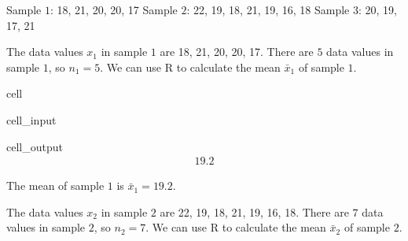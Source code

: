 \documentclass[letterpaper,10pt,english]{jupyterBook}
\begin{document}
\sphinxAtStartPar
Sample \(1\):  18, 21, 20, 20, 17 
Sample \(2\):  22, 19, 18, 21, 19, 16, 18 
Sample \(3\):  20, 19, 17, 21

\sphinxAtStartPar
The data values \(x_1\) in sample \(1\) are 18, 21, 20, 20, 17. There are \(5\) data values in sample \(1\), so \(n_1 = 5\). We can use R to calculate the mean \(\bar{x}_1\) of sample \(1\).

\begin{sphinxuseclass}{cell}\begin{sphinxVerbatimInput}

\begin{sphinxuseclass}{cell_input}
\begin{sphinxVerbatim}[commandchars=\\\{\}]

\end{sphinxVerbatim}

\end{sphinxuseclass}\end{sphinxVerbatimInput}
\begin{sphinxVerbatimOutput}

\begin{sphinxuseclass}{cell_output}\begin{equation*}
\begin{split}19.2\end{split}
\end{equation*}
\end{sphinxuseclass}\end{sphinxVerbatimOutput}

\end{sphinxuseclass}
\sphinxAtStartPar
The mean of sample \(1\) is \(\bar{x}_1 = 19.2\).

\sphinxAtStartPar
The data values \(x_2\) in sample \(2\) are 22, 19, 18, 21, 19, 16, 18. There are \(7\) data values in sample \(2\), so \(n_2 = 7\). We can use R to calculate the mean \(\bar{x}_2\) of sample \(2\).
\end{document}

